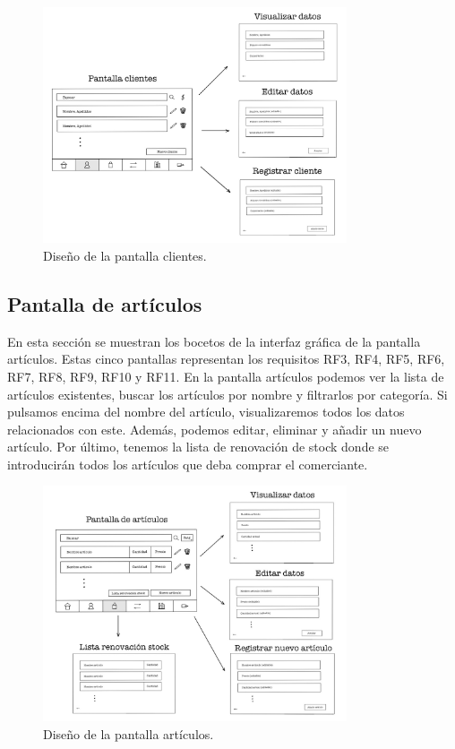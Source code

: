 \begin{figure}[ht]
	\centering
	\includegraphics[width=0.8\textwidth, angle=270]{imagenes/pantalla_clientes.JPG}
	\caption{Diseño de la pantalla clientes.}
	\label{fig:pantallaclientes}
\end{figure}

\newpage

\subsection{Pantalla de artículos}

En esta sección se muestran los bocetos de la interfaz gráfica de la pantalla artículos. Estas cinco pantallas representan los requisitos RF3, RF4, RF5, RF6, RF7, RF8, RF9, RF10 y RF11. En la pantalla artículos podemos ver la lista de artículos existentes, buscar los artículos por nombre y filtrarlos por categoría. Si pulsamos encima del nombre del artículo, visualizaremos todos los datos relacionados con este. Además, podemos editar, eliminar y añadir un nuevo artículo. Por último, tenemos la lista de renovación de stock donde se introducirán todos los artículos que deba comprar el comerciante. 


\begin{figure}[ht]
	\centering
	\includegraphics[width=0.8\textwidth, angle=270]{imagenes/pantalla_articulos.JPG}
	\caption{Diseño de la pantalla artículos.}
	\label{fig:pantallaarticulos}
\end{figure}

